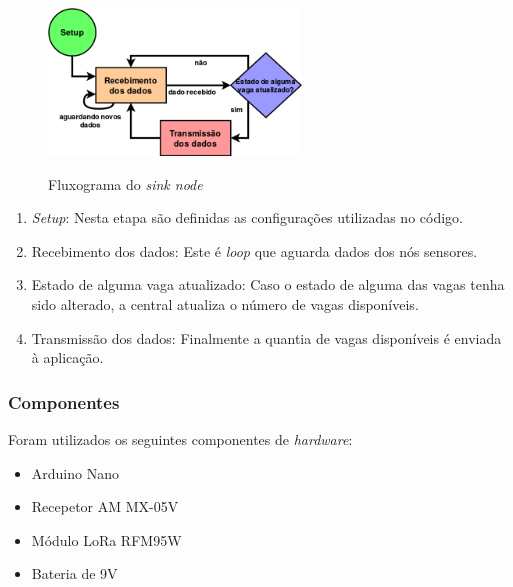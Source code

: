 \documentclass[oneside,openright,12pt]{ufsm_2015} %
\begin{document}
    \begin{figure}[ht]
     	    \caption{\label{exepretex} Fluxograma do \textit{sink node}}
            \centering
            \includegraphics[width=0.6\textwidth]{figuras/central.png}
            \vspace{\baselineskip} %
            \label{fig:flux-sink-node}
    \end{figure}
    
    \begin{enumerate}
        \item \textit{Setup}: Nesta etapa são definidas as configurações utilizadas no código.
        \item Recebimento dos dados: Este é \textit{loop} que aguarda dados dos nós sensores. 
        \item Estado de alguma vaga atualizado: Caso o estado de alguma das vagas tenha sido alterado, a central atualiza o número de vagas disponíveis.
        \item Transmissão dos dados: Finalmente a quantia de vagas disponíveis é enviada à aplicação.
    \end{enumerate}
    
    \subsubsection{Componentes}
    Foram utilizados os seguintes componentes de \textit{hardware}:
    \begin{itemize}
        \item Arduino Nano
        \item Recepetor AM MX-05V
        \item Módulo LoRa RFM95W
        \item Bateria de 9V
    \end{itemize}
 
\end{document}
